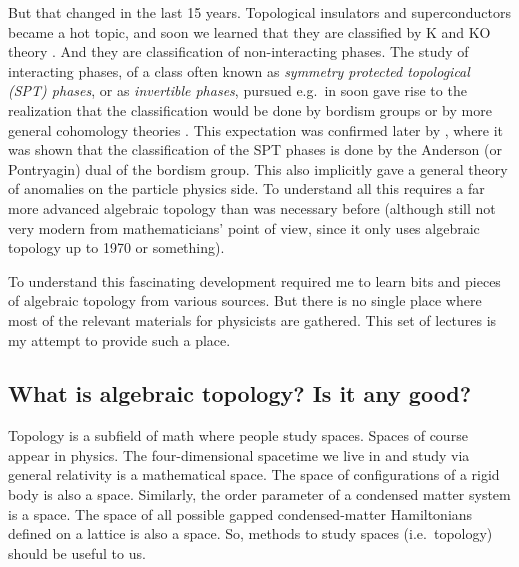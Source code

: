 \documentclass[12pt]{article}
\numberwithin{equation}{section}
\theoremstyle{remark}
\begin{document}
But that changed in the last 15 years. 
Topological insulators and superconductors became a hot topic,
and soon we learned that they are classified by K and KO theory \cite{Schnyder:2008tya,Kitaev:2009mg,Ryu:2010zza}.
And they are classification of non-interacting phases.
The study of interacting phases, of a class often known as \emph{symmetry protected topological (SPT) phases},
or as \emph{invertible phases}, 
pursued e.g.~in \cite{Fidkowski:2009dba,Chen:2011pg,Gu:2012ib,Metlitski:2014xqa} 
soon gave rise to the realization that the classification would be done by bordism groups \cite{Kapustin:2014dxa}
or by more general cohomology theories \cite{KitaevCollapse}.
This expectation was confirmed later by \cite{Freed:2016rqq,Yonekura:2018ufj},
where it was shown that the classification of the SPT phases is done by 
the Anderson (or Pontryagin) dual of the bordism group.
This also implicitly gave a general theory of anomalies on the particle physics side.
To understand all this requires a far more advanced algebraic topology than was necessary before
(although still not very modern from mathematicians' point of view, 
since it only uses algebraic topology up to 1970 or something).

To understand this fascinating development required me to learn bits and pieces of algebraic topology 
from various sources. But there is no single place where most of the relevant materials for physicists
are gathered. 
This set of lectures is my attempt to provide such a place.

\subsection{What is algebraic topology? Is it any good?}

Topology is a subfield of math where people study spaces.
Spaces of course appear in physics. 
The four-dimensional spacetime we live in and study via general relativity is a mathematical space.
The space of configurations of a rigid body is also a space.
Similarly, the order parameter of a condensed matter system is a space.
The space of all possible gapped condensed-matter Hamiltonians defined on a lattice 
is also a space.
So, methods to study spaces (i.e.~topology) should be useful to us.
\end{document}
